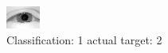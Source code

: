 \begin{figure}[h!]
\begin{center}
\includegraphics[width=0.60\columnwidth]{figures/ID2292_class_1_target_2.png}
\end{center}
\caption{ Classification: 1 actual target: 2}
\label{fig:ID2292_class_1_target_2}
\end{figure}
